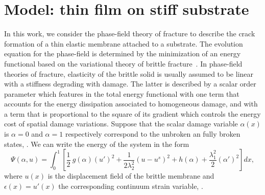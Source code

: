 \section{Model: thin film on stiff substrate}
\label{sec:rigid}

In this work, we consider the phase-field theory of fracture to describe the crack formation of {a thin elastic membrane} attached to a substrate. The evolution equation for the phase-field is determined by the minimization of an energy functional based on the variational theory of brittle fracture~\cite{bourdin:2008-the-variational}.
In phase-field theories of fracture, elasticity of the brittle solid is usually assumed to be linear with a stiffness degrading with damage. The latter is described by a scalar order parameter which features in the total energy functional with one term that accounts for the energy dissipation associated to homogeneous damage, and with a term that is proportional to the square of its gradient which controls the energy cost of spatial damage variations.
Suppose that the scalar damage variable $\alpha(x)$ is  $\alpha=0$ and $\alpha=1$ respectively correspond to the unbroken an fully broken states, . We can write the energy of the system in the  form
\begin{equation}
\label{modeld}
\Psi(\alpha, u) = \int_{0}^{1} \left[ \frac{1}{2} \ g(\alpha)(u')^2 
+ \frac{1}{2 \lambda_2^2} (u-u^s)^2
+ h(\alpha) + \frac{\lambda_1^2}{2}(\alpha')^2 
 \right] dx,
\end{equation}
where $u(x)$ is the displacement field of the brittle membrane and 
$\epsilon(x)=u'(x)$ the corresponding continuum strain variable, . 
